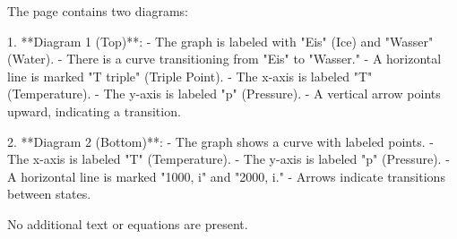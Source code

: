The page contains two diagrams:  

1. **Diagram 1 (Top)**:  
   - The graph is labeled with "Eis" (Ice) and "Wasser" (Water).  
   - There is a curve transitioning from "Eis" to "Wasser."  
   - A horizontal line is marked "T triple" (Triple Point).  
   - The x-axis is labeled "T" (Temperature).  
   - The y-axis is labeled "p" (Pressure).  
   - A vertical arrow points upward, indicating a transition.  

2. **Diagram 2 (Bottom)**:  
   - The graph shows a curve with labeled points.  
   - The x-axis is labeled "T" (Temperature).  
   - The y-axis is labeled "p" (Pressure).  
   - A horizontal line is marked "1000, i" and "2000, i."  
   - Arrows indicate transitions between states.  

No additional text or equations are present.